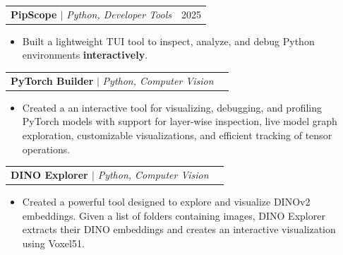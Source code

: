 \documentclass[a4paper,11pt]{article}
\makeatletter
\newcommand{\resumeItem}[1]{
  \item\small{
    {#1 \vspace{-2pt}}
  }
}
\newcommand{\resumeProjectHeading}[2]{
    \item
    \begin{tabular*}{0.97\textwidth}{l@{\extracolsep{\fill}}r}
      \small#1 & #2 \\
    \end{tabular*}\vspace{-7pt}
}
\newcommand{\resumeItemListStart}{\begin{itemize}}
\newcommand{\resumeItemListEnd}{\end{itemize}\vspace{-7pt}}
\makeatother
\begin{document}
    \resumeProjectHeading
    {\textbf{PipScope \href{https://pypi.org/project/pipscope/}\faPython} $|$ \footnotesize\emph{Python, Developer Tools}}{2025}
    \resumeItemListStart
        \resumeItem{Built a lightweight TUI tool to inspect, analyze, and debug Python environments \textbf{interactively}.}
    \resumeItemListEnd

                \resumeProjectHeading
        {\textbf{PyTorch Builder} $|$ \footnotesize\emph{Python, Computer Vision}}{}
        \resumeItemListStart
            \resumeItem{Created a an interactive tool for visualizing, debugging, and profiling PyTorch models with support for layer-wise inspection, live model graph exploration, customizable visualizations, and efficient tracking of tensor operations.}
        \resumeItemListEnd

        
            \resumeProjectHeading
        {\textbf{DINO Explorer \href{https://pypi.org/project/dinoexplorer/}\faPython} $|$ \footnotesize\emph{Python, Computer Vision}}{}
        \resumeItemListStart
            \resumeItem{Created a powerful tool designed to explore and visualize DINOv2 embeddings. Given a list of folders containing images, DINO Explorer extracts their DINO embeddings and creates an interactive visualization using Voxel51.}
        \resumeItemListEnd

    
          
    
\end{document}
